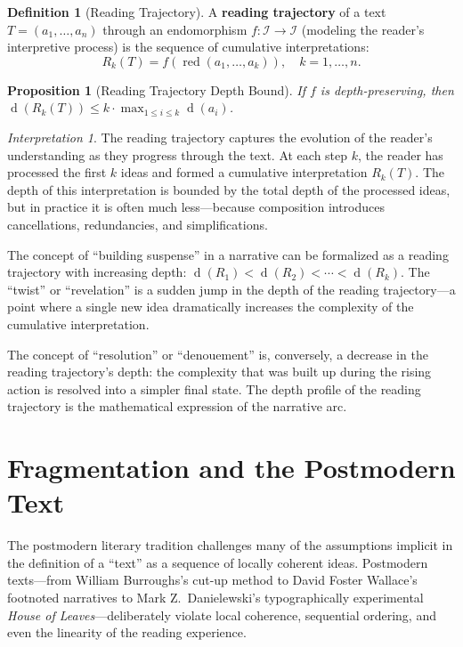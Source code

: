 \documentclass[11pt,openany]{book}
\theoremstyle{definition}
\newtheorem{definition}[axiom]{Definition}
\theoremstyle{plain}
\newtheorem{proposition}[axiom]{Proposition}
\theoremstyle{remark}
\newtheorem{interpretation}[axiom]{Interpretation}
\newcommand{\IS}{\mathcal{I}}               %
\newcommand{\depth}{\operatorname{d}}       %
\begin{document}
\begin{definition}[Reading Trajectory]
A \textbf{reading trajectory} of a text $T = (a_1, \ldots, a_n)$ through an endomorphism $f : \IS \to \IS$ (modeling the reader's interpretive process) is the sequence of cumulative interpretations:
\[
R_k(T) = f(\operatorname{red}(a_1, \ldots, a_k)), \quad k = 1, \ldots, n.
\]
\end{definition}

\begin{proposition}[Reading Trajectory Depth Bound]
If $f$ is depth-preserving, then $\depth(R_k(T)) \leq k \cdot \max_{1 \leq i \leq k} \depth(a_i)$.
\end{proposition}

\begin{interpretation}
The reading trajectory captures the evolution of the reader's understanding as they progress through the text. At each step $k$, the reader has processed the first $k$ ideas and formed a cumulative interpretation $R_k(T)$. The depth of this interpretation is bounded by the total depth of the processed ideas, but in practice it is often much less---because composition introduces cancellations, redundancies, and simplifications.

The concept of ``building suspense'' in a narrative can be formalized as a reading trajectory with increasing depth: $\depth(R_1) < \depth(R_2) < \cdots < \depth(R_k)$. The ``twist'' or ``revelation'' is a sudden jump in the depth of the reading trajectory---a point where a single new idea dramatically increases the complexity of the cumulative interpretation.

The concept of ``resolution'' or ``denouement'' is, conversely, a decrease in the reading trajectory's depth: the complexity that was built up during the rising action is resolved into a simpler final state. The depth profile of the reading trajectory is the mathematical expression of the narrative arc.
\end{interpretation}

\section{Fragmentation and the Postmodern Text}

The postmodern literary tradition challenges many of the assumptions implicit in the definition of a ``text'' as a sequence of locally coherent ideas. Postmodern texts---from William Burroughs's cut-up method to David Foster Wallace's footnoted narratives to Mark Z.~Danielewski's typographically experimental \emph{House of Leaves}---deliberately violate local coherence, sequential ordering, and even the linearity of the reading experience.
\end{document}
